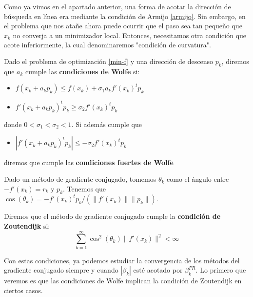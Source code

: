 Como ya vimos en el apartado anterior, una forma de acotar la dirección de búsqueda en línea era mediante la condición de Armijo \ref{armijo}. Sin embargo, en el problema que nos atañe ahora puede ocurrir que el paso sea tan pequeño que $x_k$ no converja a un minimizador local. Entonces, necesitamos otra condición que acote inferiormente, la cual denominaremos "condición de curvatura".

\begin{definition}
	Dado el problema de optimización \ref{min-f} y una dirección de descenso $p_k$, diremos que $a_k$ cumple las \textbf{condiciones de Wolfe} si:
	\begin{itemize}
		\item $f(x_k+a_kp_k) \leq f(x_k) + \sigma_1 a_k f'(x_k)^t p_k$
		\item $f'(x_k+a_kp_k)^t p_k \geq \sigma_2 f'(x_k)^t p_k$
	\end{itemize}
	donde $0 < \sigma_1 < \sigma_2 < 1$. Si además cumple que
	\begin{itemize}
		\item $|f'(x_k+a_kp_k)^t p_k| \leq -\sigma_2 f'(x_k)^t p_k$
	\end{itemize}
	diremos que cumple las \textbf{condiciones fuertes de Wolfe}
\end{definition}

Dado un método de gradiente conjugado, tomemos $\theta_k$ como el ángulo entre $-f'(x_k)=r_k$ y $p_k$. Tenemos que $\cos (\theta_k) = -f'(x_k)^tp_k / (\|f'(x_k)\|\|p_k\|)$.
\begin{definition}
	Diremos que el método de gradiente conjugado cumple la \textbf{condición de Zoutendijk} si:
	\[
		\sum_{k=1}^\infty \cos^2 (\theta_k) \|f'(x_k)\|^2 < \infty
	\]
\end{definition}

Con estas condiciones, ya podemos estudiar la convergencia de los métodos del gradiente conjugado siempre y cuando $|\beta_k|$ esté acotado por $\beta_k^{FR}$. Lo primero que veremos es que las condiciones de Wolfe implican la condición de Zoutendijk en ciertos casos.

